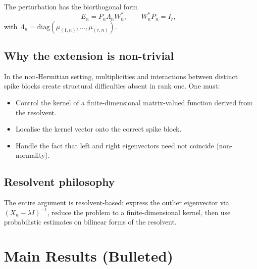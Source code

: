 \documentclass[11pt,a4paper]{article}
\begin{document}
The perturbation has the biorthogonal form
\[
E_n = P_n \Lambda_n W_n^*, \qquad W_n^* P_n = I_r,
\]
with $\Lambda_n = \mathrm{diag}(\mu_{(1,n)}, \ldots, \mu_{(r,n)})$.

\subsection{Why the extension is non-trivial}
In the non-Hermitian setting, multiplicities and interactions between distinct spike blocks create structural difficulties absent in rank one.  One must:
\begin{itemize}
\item Control the kernel of a finite-dimensional matrix-valued function derived from the resolvent.
\item Localise the kernel vector onto the correct spike block.
\item Handle the fact that left and right eigenvectors need not coincide (non-normality).
\end{itemize}

\subsection{Resolvent philosophy}
The entire argument is resolvent-based: express the outlier eigenvector via $(X_n - \lambda I)^{-1}$, reduce the problem to a finite-dimensional kernel, then use probabilistic estimates on bilinear forms of the resolvent.

\section{Main Results (Bulleted)}
\end{document}
